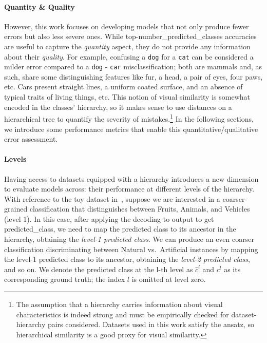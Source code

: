 \paragraph{Quantity \& Quality}
\label{par:metrics-quantity-quality}
However, this work focuses on developing models that not only produce fewer errors but also less severe ones. While top-\gls{number_predicted_classes} accuracies are useful to capture the \emph{quantity} aspect, they do not provide any information about their \emph{quality}.
For example, confusing a \texttt{dog} for a \texttt{cat} can be considered a milder error compared to a \texttt{dog} - \texttt{car} misclassification; both are mammals and, as such, share some distinguishing features like fur, a head, a pair of eyes, four paws, etc. Cars present straight lines, a uniform coated surface, and an absence of typical traits of living things, etc.
This notion of visual similarity is somewhat encoded in the classes' hierarchy, so it makes sense to use distances on a hierarchical tree to quantify the severity of mistakes.\footnote{The assumption that a hierarchy carries information about visual characteristics is indeed strong and must be empirically checked for dataset-hierarchy pairs considered.
Datasets used in this work satisfy the ansatz, so hierarchical similarity is a good proxy for visual similarity.} In the following sections, we introduce some performance metrics that enable this quantitative/qualitative error assessment.

\paragraph{Levels}
\label{par:metrics-levels}
Having access to datasets equipped with a hierarchy introduces a new dimension to evaluate models across: their performance at different levels of the hierarchy.
With reference to the toy dataset in~, suppose we are interested in a coarser-grained classification that distinguishes between Fruits, Animals, and Vehicles (level 1). In this case, after applying the decoding to \gls{output} to get \gls{predicted_class}, we need to map the predicted class to its ancestor in the hierarchy, obtaining the \emph{level-1 predicted class}. We can produce an even coarser classification discriminating between Natural vs.\ Artificial instances by mapping the level-1 predicted class to its ancestor, obtaining the \emph{level-2 predicted class}, and so on.
We denote the predicted class at the l-th level as $\hat{c}^l$ and $c^l$ as its corresponding ground truth; the index $l$ is omitted at level zero.

